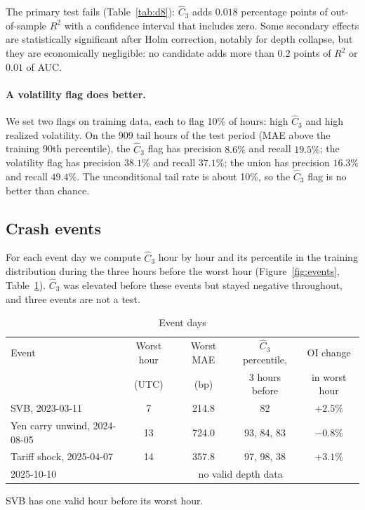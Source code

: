 \documentclass[12pt]{article}
\theoremstyle{definition}
\theoremstyle{remark}
\begin{document}
The primary test fails (Table~\ref{tab:d8}): $\hat C_3$ adds $0.018$ percentage points of out-of-sample $R^2$ with a confidence interval that includes zero. Some secondary effects are statistically significant after Holm correction, notably for depth collapse, but they are economically negligible: no candidate adds more than $0.2$ points of $R^2$ or $0.01$ of AUC.

\paragraph{A volatility flag does better.} We set two flags on training data, each to flag 10\% of hours: high $\hat C_3$ and high realized volatility. On the 909 tail hours of the test period (MAE above the training 90th percentile), the $\hat C_3$ flag has precision $8.6\%$ and recall $19.5\%$; the volatility flag has precision $38.1\%$ and recall $37.1\%$; the union has precision $16.3\%$ and recall $49.4\%$. The unconditional tail rate is about 10\%, so the $\hat C_3$ flag is no better than chance.

\subsection{Crash events}
For each event day we compute $\hat C_3$ hour by hour and its percentile in the training distribution during the three hours before the worst hour (Figure~\ref{fig:events}, Table~\ref{tab:d9}). $\hat C_3$ was elevated before these events but stayed negative throughout, and three events are not a test.

\begin{table}[t]\centering\small
\begin{threeparttable}
\caption{Event days}\label{tab:d9}
\begin{tabular}{lcccc}
\toprule
Event & Worst hour & Worst MAE & $\hat C_3$ percentile, & OI change\\
 & (UTC) & (bp) & 3 hours before & in worst hour\\
\midrule
SVB, 2023-03-11 & 7 & 214.8 & 82 & $+2.5\%$\\
Yen carry unwind, 2024-08-05 & 13 & 724.0 & 93, 84, 83 & $-0.8\%$\\
Tariff shock, 2025-04-07 & 14 & 357.8 & 97, 98, 38 & $+3.1\%$\\
2025-10-10 & \multicolumn{4}{c}{no valid depth data}\\
\bottomrule
\end{tabular}
\begin{tablenotes}\footnotesize\item SVB has one valid hour before its worst hour. \end{tablenotes}
\end{threeparttable}
\end{table}
\end{document}
